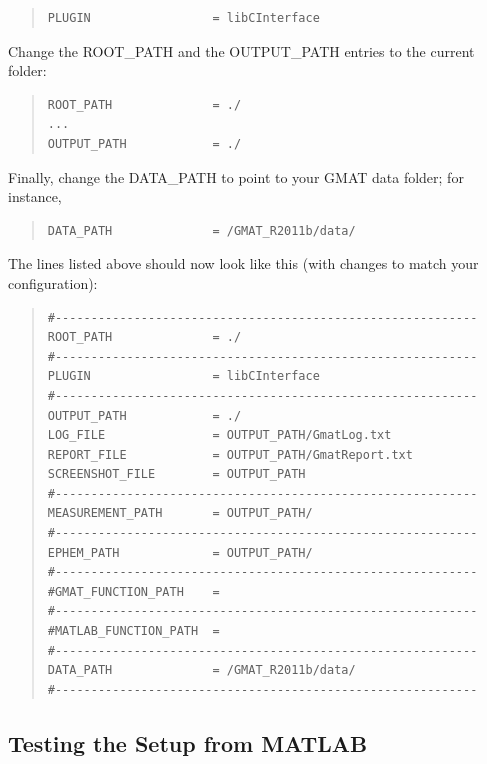 \documentclass[letterpaper,10pt]{article}
\begin{document}
\begin{quote}
\begin{verbatim}
PLUGIN                 = libCInterface
\end{verbatim}
\end{quote}

\noindent Change the ROOT\_PATH and the OUTPUT\_PATH entries to the current folder: 

\begin{quote}
\begin{verbatim}
ROOT_PATH              = ./
...
OUTPUT_PATH            = ./
\end{verbatim}
\end{quote}

\noindent Finally, change the DATA\_PATH to point to your GMAT data folder; for instance, 

\begin{quote}
\begin{verbatim}
DATA_PATH              = /GMAT_R2011b/data/
\end{verbatim}
\end{quote}

\noindent The lines listed above should now look like this (with changes to match your configuration): 

\begin{quote}
\begin{verbatim}
#-----------------------------------------------------------
ROOT_PATH              = ./
#-----------------------------------------------------------
PLUGIN                 = libCInterface
#-----------------------------------------------------------
OUTPUT_PATH            = ./
LOG_FILE               = OUTPUT_PATH/GmatLog.txt
REPORT_FILE            = OUTPUT_PATH/GmatReport.txt
SCREENSHOT_FILE        = OUTPUT_PATH
#-----------------------------------------------------------
MEASUREMENT_PATH       = OUTPUT_PATH/
#-----------------------------------------------------------
EPHEM_PATH             = OUTPUT_PATH/
#-----------------------------------------------------------
#GMAT_FUNCTION_PATH    = 
#-----------------------------------------------------------
#MATLAB_FUNCTION_PATH  = 
#-----------------------------------------------------------
DATA_PATH              = /GMAT_R2011b/data/
#-----------------------------------------------------------
\end{verbatim}
\end{quote}


\subsection{Testing the Setup from MATLAB}
\end{document}

